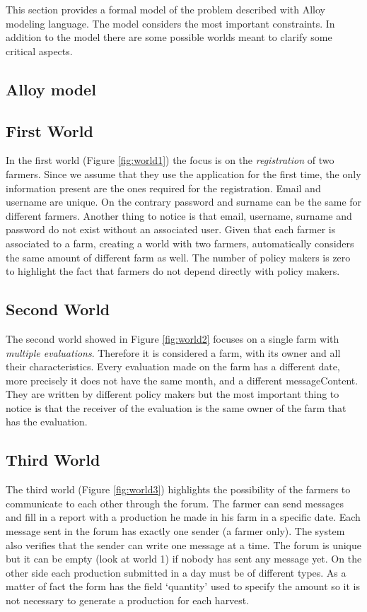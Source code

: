 
This section provides a formal model of the problem described with Alloy modeling language. 
The model considers the most important constraints. In addition to the model there are some 
possible worlds meant to clarify some critical aspects.


\subsection{Alloy model}


\subsection{First World}
In the first world (Figure \ref{fig:world1}) the focus is on the \textsl{registration} of two farmers. 
Since we assume that they use the application for the first time, the only information present 
are the ones required for the registration. Email and username are unique. On the contrary password and 
surname can be the same for different farmers. Another thing to notice is that email, username, surname and password do not 
exist without an associated user. 
Given that each farmer is associated to a farm, creating a world with two farmers, automatically considers
the same amount of different farm as well. The number of policy makers is zero to 
highlight the fact that farmers do not depend directly with policy makers.



\subsection{Second World}
The second world showed in Figure \ref{fig:world2} focuses on a single farm with \textsl{multiple evaluations}. 
Therefore it is considered a farm, with its owner and all their characteristics. 
Every evaluation made on the farm has a different date, more precisely it does not 
have the same month, and a different messageContent. They are written by different policy 
makers but the most important thing to notice is that the receiver of the evaluation 
is the same owner of the farm that has the evaluation.


\subsection{Third World}
The third world (Figure \ref{fig:world3}) highlights the possibility 
of the farmers to communicate to each other through the forum. The farmer can send messages and fill in a report with a production he made in his 
farm in a specific date. Each message sent in the forum has exactly 
one sender (a farmer only). The system also verifies that the sender can write 
one message at a time. 
The forum is unique but it can be empty (look at world 1) if nobody has sent any message yet. 
On the other side each production submitted in a day must be of different types. As a matter of fact the form 
has the field ‘quantity’ used to specify the amount so it is not necessary to generate a production for each harvest.

